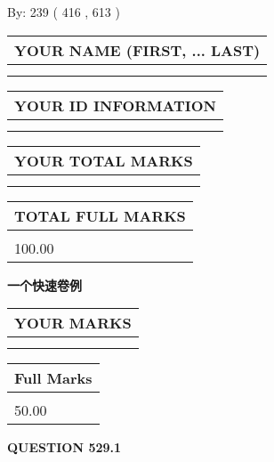\documentclass{ctexart}
\begin{document}
   
\hspace{1.0in} By: 
 239 ( 416 ,  613 )
   
   
   
   
\newpage 
\setcounter{page}{ 
   529001 } 
   
   
   
   
\noindent\begin{tabular}{|l|}
\hline
YOUR NAME (FIRST, ... LAST)  \\
\hline
 \\ 
 \\ 
\hline
\end{tabular}
\hspace{0.05in} \begin{tabular}{|l|}
\hline
 YOUR   ID   INFORMATION  \\
\hline
 \\ 
 \\ 
\hline
\end{tabular}
   
   
\vspace{0.2in}\noindent\begin{tabular}{|l|}
\hline
YOUR TOTAL MARKS  \\
\hline
 \\ 
 \\ 
\hline
\end{tabular}
\hspace{0.05in} \begin{tabular}{|l|}
\hline
TOTAL FULL MARKS  \\
\hline
 \\ 
100.00 \\
\hline
\end{tabular}
   
   
 \vspace{0.2in}
{\LARGE {\textbf{ 一个快速卷例}}}
   
   
  
\vspace{0.2in}
  
\noindent\begin{tabular}{|l|}
\hline
 YOUR MARKS  \\
\hline
 \\ 
 \\ 
\hline
\end{tabular}
\hspace{0.05in} \begin{tabular}{|l|}
\hline
 Full Marks  \\
\hline
 \\ 
50.00 \\
\hline
\end{tabular}
{\textbf{\Large{QUESTION
529.1 
}}}
  
\end{document}
